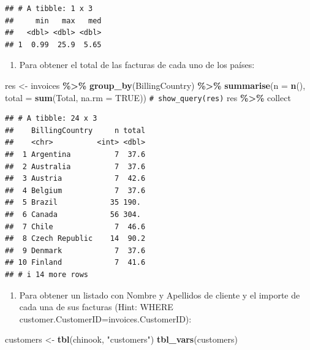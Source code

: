 \documentclass[
]{book}
\newenvironment{Shaded}{\begin{snugshade}}{\end{snugshade}}
\newcommand{\AttributeTok}[1]{\textcolor[rgb]{0.13,0.29,0.53}{#1}}
\newcommand{\CommentTok}[1]{\textcolor[rgb]{0.56,0.35,0.01}{\textit{#1}}}
\newcommand{\ConstantTok}[1]{\textcolor[rgb]{0.56,0.35,0.01}{#1}}
\newcommand{\FunctionTok}[1]{\textcolor[rgb]{0.13,0.29,0.53}{\textbf{#1}}}
\newcommand{\NormalTok}[1]{#1}
\newcommand{\OtherTok}[1]{\textcolor[rgb]{0.56,0.35,0.01}{#1}}
\newcommand{\SpecialCharTok}[1]{\textcolor[rgb]{0.81,0.36,0.00}{\textbf{#1}}}
\newcommand{\StringTok}[1]{\textcolor[rgb]{0.31,0.60,0.02}{#1}}
\providecommand{\tightlist}{%
  \setlength{\itemsep}{0pt}\setlength{\parskip}{0pt}}
\theoremstyle{break}
\theoremstyle{nonumberplain}
\renewcommand{\CommentTok}[1]{\textcolor[rgb]{0.41,0.41,0.41}{\texttt{#1}}}
\begin{document}
\begin{verbatim}
## # A tibble: 1 x 3
##     min   max   med
##   <dbl> <dbl> <dbl>
## 1  0.99  25.9  5.65
\end{verbatim}

\begin{enumerate}
\def\labelenumi{\arabic{enumi}.}
\setcounter{enumi}{2}
\tightlist
\item
  Para obtener el total de las facturas de cada uno de los países:
\end{enumerate}

\begin{Shaded}
\begin{Highlighting}[]
\NormalTok{res }\OtherTok{\textless{}{-}}\NormalTok{ invoices }\SpecialCharTok{\%\textgreater{}\%} \FunctionTok{group\_by}\NormalTok{(BillingCountry) }\SpecialCharTok{\%\textgreater{}\%} 
          \FunctionTok{summarise}\NormalTok{(}\AttributeTok{n =} \FunctionTok{n}\NormalTok{(), }\AttributeTok{total =} \FunctionTok{sum}\NormalTok{(Total, }\AttributeTok{na.rm =} \ConstantTok{TRUE}\NormalTok{))}
\CommentTok{\# show\_query(res)}
\NormalTok{res  }\SpecialCharTok{\%\textgreater{}\%}\NormalTok{ collect}
\end{Highlighting}
\end{Shaded}

\begin{verbatim}
## # A tibble: 24 x 3
##    BillingCountry     n total
##    <chr>          <int> <dbl>
##  1 Argentina          7  37.6
##  2 Australia          7  37.6
##  3 Austria            7  42.6
##  4 Belgium            7  37.6
##  5 Brazil            35 190. 
##  6 Canada            56 304. 
##  7 Chile              7  46.6
##  8 Czech Republic    14  90.2
##  9 Denmark            7  37.6
## 10 Finland            7  41.6
## # i 14 more rows
\end{verbatim}

\begin{enumerate}
\def\labelenumi{\arabic{enumi}.}
\setcounter{enumi}{3}
\tightlist
\item
  Para obtener un listado con Nombre y Apellidos de cliente y el importe de cada una de sus facturas (Hint: WHERE customer.CustomerID=invoices.CustomerID):
\end{enumerate}

\begin{Shaded}
\begin{Highlighting}[]
\NormalTok{customers }\OtherTok{\textless{}{-}} \FunctionTok{tbl}\NormalTok{(chinook, }\StringTok{"customers"}\NormalTok{)}
\FunctionTok{tbl\_vars}\NormalTok{(customers) }
\end{Highlighting}
\end{Shaded}
\end{document}
